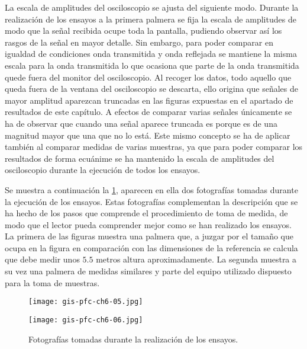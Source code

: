 La escala de amplitudes del osciloscopio se ajusta del siguiente modo.
Durante la realización de los ensayos a la primera palmera se fija la
escala de amplitudes de modo que la señal recibida ocupe toda la pantalla,
pudiendo observar así los rasgos de la señal en mayor detalle. Sin embargo,
para poder comparar en igualdad de condiciones onda transmitida y onda
reflejada se mantiene la misma escala para la onda transmitida lo que
ocasiona que parte de la onda transmitida quede fuera del monitor del
osciloscopio. Al recoger los datos, todo aquello que queda fuera de la
ventana del osciloscopio se descarta, ello origina que señales de mayor
amplitud aparezcan truncadas en las figuras expuestas en el apartado de
resultados de este capítulo. A efectos de comparar varias señales
únicamente se ha de observar que cuando una señal aparece truncada es
porque es de una magnitud mayor que una que no lo está. Este mismo concepto
se ha de aplicar también al comparar medidas de varias muestras, ya que
para poder comparar los resultados de forma ecuánime se ha mantenido la
escala de amplitudes del osciloscopio durante la ejecución de todos los
ensayos.

Se muestra a continuación la \cref{fig:tests}, aparecen en ella dos
fotografías tomadas durante la ejecución de los ensayos. Estas fotografías
complementan la descripción que se ha hecho de los pasos que comprende el
procedimiento de toma de medida, de modo que el lector pueda comprender
mejor como se han realizado los ensayos. La primera de las figuras muestra
una palmera que, a juzgar por el tamaño que ocupa en la figura en
comparación con las dimensiones de la referencia se calcula que debe medir
unos $5.5$ metros altura aproximadamente. La segunda muestra a su vez una
palmera de medidas similares y parte del equipo utilizado dispuesto para la
toma de muestras.

\begin{figure}
    \begin{center}
	\begin{minipage}[c]{.425\textwidth}\label{fig:testheight}
	    \texttt{[image: gis-pfc-ch6-05.jpg]}
	\end{minipage}
	\begin{minipage}[c]{.425\textwidth}\label{fig:testequipment}
	    \texttt{[image: gis-pfc-ch6-06.jpg]}
	\end{minipage}
    \end{center}
    \caption[Fotografías tomadas durante la realización de los
    ensayos]{Fotografías tomadas durante la realización de los ensayos.}
    \label{fig:tests}
\end{figure}



